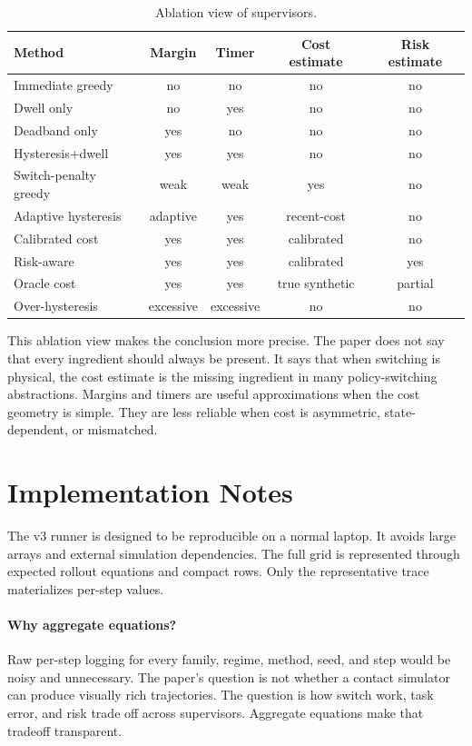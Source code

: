 \documentclass{article}
\begin{document}
\begin{table}[h]
\centering
\caption{Ablation view of supervisors.}
\small
\begin{tabular}{lcccc}
\toprule
Method & Margin & Timer & Cost estimate & Risk estimate \\
\midrule
Immediate greedy & no & no & no & no \\
Dwell only & no & yes & no & no \\
Deadband only & yes & no & no & no \\
Hysteresis+dwell & yes & yes & no & no \\
Switch-penalty greedy & weak & weak & yes & no \\
Adaptive hysteresis & adaptive & yes & recent-cost & no \\
Calibrated cost & yes & yes & calibrated & no \\
Risk-aware & yes & yes & calibrated & yes \\
Oracle cost & yes & yes & true synthetic & partial \\
Over-hysteresis & excessive & excessive & no & no \\
\bottomrule
\end{tabular}
\end{table}

This ablation view makes the conclusion more precise.
The paper does not say that every ingredient should always be present.
It says that when switching is physical, the cost estimate is the missing ingredient in many policy-switching abstractions.
Margins and timers are useful approximations when the cost geometry is simple.
They are less reliable when cost is asymmetric, state-dependent, or mismatched.

\section{Implementation Notes}

The v3 runner is designed to be reproducible on a normal laptop.
It avoids large arrays and external simulation dependencies.
The full grid is represented through expected rollout equations and compact rows.
Only the representative trace materializes per-step values.

\paragraph{Why aggregate equations?}
Raw per-step logging for every family, regime, method, seed, and step would be noisy and unnecessary.
The paper's question is not whether a contact simulator can produce visually rich trajectories.
The question is how switch work, task error, and risk trade off across supervisors.
Aggregate equations make that tradeoff transparent.
\end{document}
